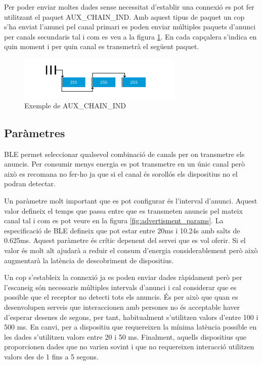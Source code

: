 Per poder enviar moltes dades sense necessitat d'establir una connexió es pot fer utilitzant el paquet AUX\_CHAIN\_IND.
Amb aquest tipus de paquet un cop s'ha enviat l'anunci pel canal primari es poden enviar múltiples paquets d'anunci per canals secundaris tal i com es veu a la figura \ref{fig:aux_chain_ind}.
En cada capçalera s'indica en quin moment i per quin canal es transmetrà el següent paquet.

\begin{figure}[h!]
	\begin{center}
		\includegraphics[width=0.7\textwidth]{./images/aux_chain_ind.png}
		\caption{Exemple de AUX\_CHAIN\_IND \cite{aux_chain_ind}}
		\label{fig:aux_chain_ind}
	\end{center}
\end{figure}

\subsection{Paràmetres}
BLE permet seleccionar qualsevol combinació de canals per on transmetre els anuncis.
Per consumir menys energia es pot transmetre en un únic canal però això es recomana no fer-ho ja que si el canal és sorollós els dispositius no el podran detectar.

Un paràmetre molt important que es pot configurar és l'interval d'anunci.
Aquest valor defineix el temps que passa entre que es transmeten anuncis pel mateix canal tal i com es pot veure en la figura \ref{fig:advertisment_params}.
La especificació de BLE defineix que pot estar entre 20ms i 10.24s amb salts de 0.625ms.
Aquest paràmetre és crític depenent del servei que es vol oferir.
Si el valor és molt alt ajudarà a reduir el consum d'energia considerablement però això augmentarà la latència de descobriment de dispositius.

Un cop s'estableix la connexió ja es poden enviar dades ràpidament però per l'escaneig són necessaris múltiples intervals d'anunci i cal considerar que es possible que el receptor no detecti tots els anuncis. 
És per això que quan es desenvolupen serveis que interaccionen amb persones no és acceptable haver d'esperar desenes de segons, per tant, habitualment s'utilitzen valors d'entre 100 i 500 ms.
En canvi, per a dispositiu que requereixen la mínima latència possible en les dades s'utilitzen valors entre 20 i 50 ms.
Finalment, aquells dispositius que proporcionen dades que no varien sovint i que no requereixen interacció utilitzen valors des de 1 fins a 5 segons.

